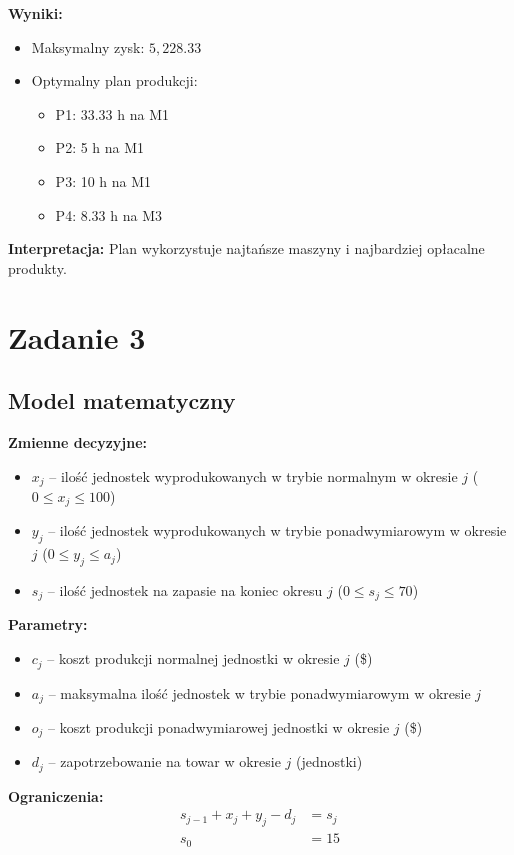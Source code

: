 \documentclass[a4paper,12pt]{article}
\begin{document}
\textbf{Wyniki:}
\begin{itemize}
\item Maksymalny zysk: $5,228.33$
\item Optymalny plan produkcji:
\begin{itemize}
\item P1: 33.33 h na M1
\item P2: 5 h na M1
\item P3: 10 h na M1
\item P4: 8.33 h na M3
\end{itemize}
\end{itemize}

\textbf{Interpretacja:} Plan wykorzystuje najtańsze maszyny i najbardziej opłacalne produkty.

\section*{Zadanie 3}
\subsection*{Model matematyczny}

\textbf{Zmienne decyzyjne:}
\begin{itemize}
\item $x_j$ -- ilość jednostek wyprodukowanych w trybie normalnym w okresie $j$ ($0 \leq x_j \leq 100$)
\item $y_j$ -- ilość jednostek wyprodukowanych w trybie ponadwymiarowym w okresie $j$ ($0 \leq y_j \leq a_j$)
\item $s_j$ -- ilość jednostek na zapasie na koniec okresu $j$ ($0 \leq s_j \leq 70$)
\end{itemize}

\textbf{Parametry:}
\begin{itemize}
\item $c_j$ -- koszt produkcji normalnej jednostki w okresie $j$ (\$)
\item $a_j$ -- maksymalna ilość jednostek w trybie ponadwymiarowym w okresie $j$
\item $o_j$ -- koszt produkcji ponadwymiarowej jednostki w okresie $j$ (\$)
\item $d_j$ -- zapotrzebowanie na towar w okresie $j$ (jednostki)
\end{itemize}

\textbf{Ograniczenia:}
\begin{align*}
s_{j-1} + x_j + y_j - d_j &= s_j \\
s_0 &= 15
\end{align*}
\end{document}
